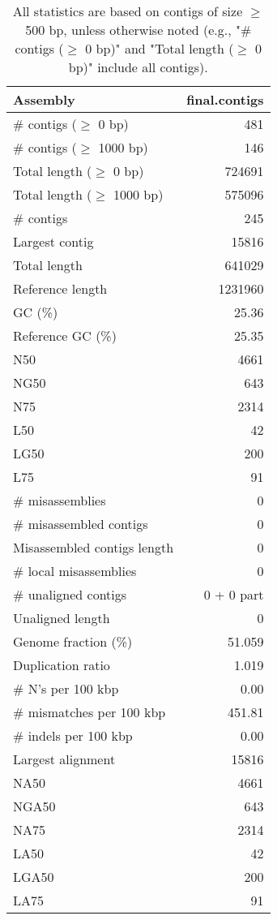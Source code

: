 \documentclass[12pt,a4paper]{article}
\begin{document}
\begin{table}[ht]
\begin{center}
\caption{All statistics are based on contigs of size $\geq$ 500 bp, unless otherwise noted (e.g., "\# contigs ($\geq$ 0 bp)" and "Total length ($\geq$ 0 bp)" include all contigs).}
\begin{tabular}{|l*{1}{|r}|}
\hline
Assembly & final.contigs \\ \hline
\# contigs ($\geq$ 0 bp) & 481 \\ \hline
\# contigs ($\geq$ 1000 bp) & 146 \\ \hline
Total length ($\geq$ 0 bp) & 724691 \\ \hline
Total length ($\geq$ 1000 bp) & 575096 \\ \hline
\# contigs & 245 \\ \hline
Largest contig & 15816 \\ \hline
Total length & 641029 \\ \hline
Reference length & 1231960 \\ \hline
GC (\%) & 25.36 \\ \hline
Reference GC (\%) & 25.35 \\ \hline
N50 & 4661 \\ \hline
NG50 & 643 \\ \hline
N75 & 2314 \\ \hline
L50 & 42 \\ \hline
LG50 & 200 \\ \hline
L75 & 91 \\ \hline
\# misassemblies & 0 \\ \hline
\# misassembled contigs & 0 \\ \hline
Misassembled contigs length & 0 \\ \hline
\# local misassemblies & 0 \\ \hline
\# unaligned contigs & 0 + 0 part \\ \hline
Unaligned length & 0 \\ \hline
Genome fraction (\%) & 51.059 \\ \hline
Duplication ratio & 1.019 \\ \hline
\# N's per 100 kbp & 0.00 \\ \hline
\# mismatches per 100 kbp & 451.81 \\ \hline
\# indels per 100 kbp & 0.00 \\ \hline
Largest alignment & 15816 \\ \hline
NA50 & 4661 \\ \hline
NGA50 & 643 \\ \hline
NA75 & 2314 \\ \hline
LA50 & 42 \\ \hline
LGA50 & 200 \\ \hline
LA75 & 91 \\ \hline
\end{tabular}
\end{center}
\end{table}
\end{document}
